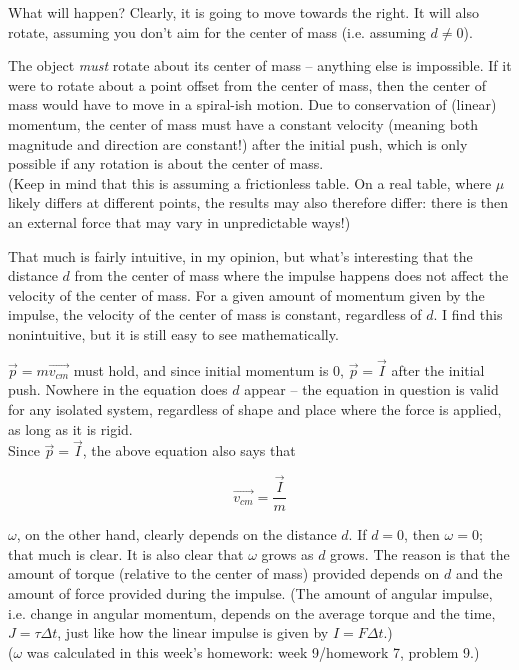 \documentclass[12pt,a4paper]{report}
\begin{document}
What will happen? Clearly, it is going to move towards the right. It will also rotate, assuming you don't aim for the center of mass (i.e. assuming $d \neq 0$).

The object \emph{must} rotate about its center of mass -- anything else is impossible. If it were to rotate about a point offset from the center of mass, then the center of mass would have to move in a spiral-ish motion. Due to conservation of (linear) momentum, the center of mass must have a constant velocity (meaning both magnitude and direction are constant!) after the initial push, which is only possible if any rotation is about the center of mass.\\
(Keep in mind that this is assuming a frictionless table. On a real table, where $\mu$ likely differs at different points, the results may also therefore differ: there is then an external force that may vary in unpredictable ways!)

That much is fairly intuitive, in my opinion, but what's interesting that the distance $d$ from the center of mass where the impulse happens does not affect the velocity of the center of mass. For a given amount of momentum given by the impulse, the velocity of the center of mass is constant, regardless of $d$. I find this nonintuitive, but it is still easy to see mathematically.

$\vec{p} = m \vec{v_{cm}}$ must hold, and since initial momentum is 0, $\vec{p} = \vec{I}$ after the initial push. Nowhere in the equation does $d$ appear -- the equation in question is valid for any isolated system, regardless of shape and place where the force is applied, as long as it is rigid.\\
Since $\vec{p} = \vec{I}$, the above equation also says that

\begin{equation}
\vec{v_{cm}} = \frac{\vec{I}}{m}
\end{equation}

$\omega$, on the other hand, clearly depends on the distance $d$. If $d = 0$, then $\omega = 0$; that much is clear. It is also clear that $\omega$ grows as $d$ grows. The reason is that the amount of torque (relative to the center of mass) provided depends on $d$ and the amount of force provided during the impulse. (The amount of angular impulse, i.e. change in angular momentum, depends on the average torque and the time, $J = \tau \Delta t$, just like how the linear impulse is given by $I = F \Delta t$.)\\
($\omega$ was calculated in this week's homework: week 9/homework 7, problem 9.)
\end{document}
